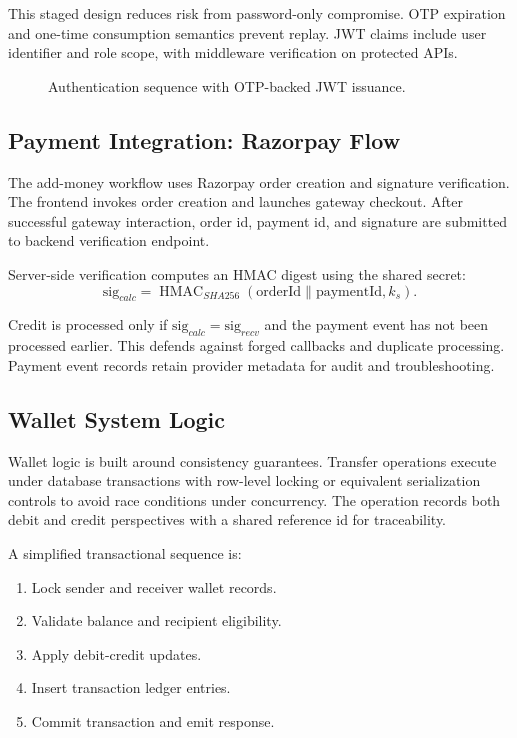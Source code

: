 \documentclass[conference]{IEEEtran}
\begin{document}
This staged design reduces risk from password-only compromise. OTP expiration and one-time consumption semantics prevent replay. JWT claims include user identifier and role scope, with middleware verification on protected APIs.

\begin{figure}[t]
\centering
{}
\caption{Authentication sequence with OTP-backed JWT issuance.}
\label{fig:auth_flow}
\end{figure}

\subsection{Payment Integration: Razorpay Flow}
The add-money workflow uses Razorpay order creation and signature verification. The frontend invokes order creation and launches gateway checkout. After successful gateway interaction, order id, payment id, and signature are submitted to backend verification endpoint.

Server-side verification computes an HMAC digest using the shared secret:
\begin{equation}
\mathrm{sig}_{calc} = \operatorname{HMAC}_{SHA256}(\mathrm{orderId} \| \mathrm{paymentId}, k_s).
\label{eq:hmac}
\end{equation}

Credit is processed only if $\mathrm{sig}_{calc} = \mathrm{sig}_{recv}$ and the payment event has not been processed earlier. This defends against forged callbacks and duplicate processing. Payment event records retain provider metadata for audit and troubleshooting.

\subsection{Wallet System Logic}
Wallet logic is built around consistency guarantees. Transfer operations execute under database transactions with row-level locking or equivalent serialization controls to avoid race conditions under concurrency. The operation records both debit and credit perspectives with a shared reference id for traceability.

A simplified transactional sequence is:
\begin{enumerate}
\item Lock sender and receiver wallet records.
\item Validate balance and recipient eligibility.
\item Apply debit-credit updates.
\item Insert transaction ledger entries.
\item Commit transaction and emit response.
\end{enumerate}
\end{document}
